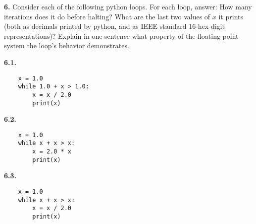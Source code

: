 \documentclass[11pt]{article}
\begin{document}
\par\bigskip
{\bf 6.}
Consider each of the following python loops.
For each loop, answer:
How many iterations does it do before halting?
What are the last two values of $x$ it prints
(both as decimals printed by python, and as
IEEE standard 16-hex-digit representations)?
Explain in one sentence what
property of the floating-point system 
the loop's behavior demonstrates.

\par\medskip
{\bf 6.1.}
\begin{verbatim}
    x = 1.0
    while 1.0 + x > 1.0:
        x = x / 2.0
        print(x)
\end{verbatim}

\par\medskip
{\bf 6.2.}
\begin{verbatim}
    x = 1.0
    while x + x > x:
        x = 2.0 * x
        print(x)
\end{verbatim}

\par\medskip
{\bf 6.3.}
\begin{verbatim}
    x = 1.0
    while x + x > x:
        x = x / 2.0
        print(x)
\end{verbatim}
        
\end{document}

